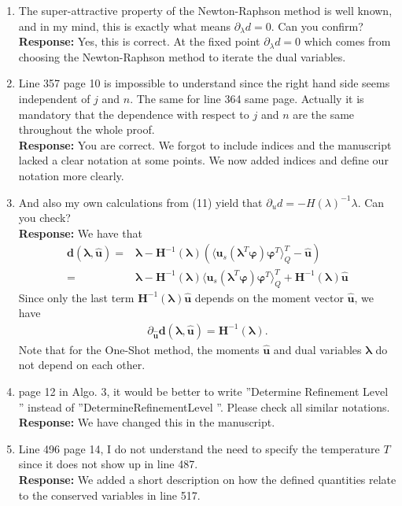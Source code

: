 \documentclass[11pt]{amsart}
\begin{document}
\begin{enumerate}
\item The super-attractive property of the Newton-Raphson method is well
known, and in my mind, this is exactly what means $\partial_{\lambda}d = 0$. Can you
confirm?
\\ \textbf{Response:} Yes, this is correct. At the fixed point $\partial_{\lambda}d = 0$ which comes from choosing the Newton-Raphson method to iterate the dual variables.
\item Line 357 page 10 is impossible to understand since the right hand side
seems independent of $j$ and $n$. The same for line 364 same page. Actually
it is mandatory that the dependence with respect to $j$ and $n$ are the same
throughout the whole proof.
\\ \textbf{Response:} You are correct. We forgot to include indices and the manuscript lacked a clear notation at some points. We now added indices and define our notation more clearly. 
\item And also my own calculations from (11) yield that $\partial_u d = -H(\lambda)^{-1}\lambda$. Can you check?
\\ \textbf{Response:} We have that
\begin{align*}
\bm d(\bm{\lambda},\bm{\hat u}) =& \bm{\lambda} - \bm{H}^{-1}(\bm\lambda)\left(\langle \bm u_s(\bm{\lambda}^T \bm\varphi)\bm\varphi^T\rangle_Q^T - \bm{\hat u}\right) \\
=& \bm{\lambda} - \bm{H}^{-1}(\bm\lambda)\langle \bm u_s(\bm{\lambda}^T \bm\varphi)\bm\varphi^T\rangle_Q^T +\bm{H}^{-1}(\bm\lambda) \bm{\hat u}
\end{align*}
Since only the last term $\bm{H}^{-1}(\bm\lambda) \bm{\hat u}$ depends on the moment vector $\bm{\hat u}$, we have
\begin{align*}
\partial_{\bm{\hat u}} \bm d(\bm{\lambda},\bm{\hat u}) = \bm{H}^{-1}(\bm\lambda).
\end{align*}
Note that for the One-Shot method, the moments $\bm{\hat u}$ and dual variables $\bm\lambda$ do not depend on each other.  
\item page 12 in Algo. 3, it would be better to write ”Determine Refinement
Level ” instead of ”DetermineRefinementLevel ”. Please check all similar
notations.
\\ \textbf{Response:} We have changed this in the manuscript.
\item Line 496 page 14, I do not understand the need to specify the temperature $T$ since it does not show up in line 487.
\\ \textbf{Response:} We added a short description on how the defined quantities relate to the conserved variables in line 517.

\end{enumerate}
\end{document}
